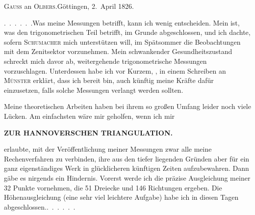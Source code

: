 \begin{center}
\textsc{Gauss} an \textsc{Olbers}.\quad Göttingen, 2.~April 1826.
\end{center}

\par\noindent\hspace*{\parindent}\mbox{.\ .\ .\ .\ .\ .}\quad Was meine Messungen betrifft, kann ich  wenig entscheiden.
Mein  ist, was den trigonometrischen Teil betrifft, im Grunde abgeschlossen, und ich dachte, sofern \textsc{Schumacher} mich  unterstützen will, im Spätsommer die Beobachtungen mit dem Zenitsektor vorzunehmen.
Mein schwankender Gesundheitszustand schreckt mich davor ab, weitergehende trigonometrische Messungen vorzuschlagen. Unterdessen habe ich vor Kurzem, , in einem Schreiben an \textsc{Münster} erklärt, dass ich bereit bin, auch künftig meine Kräfte dafür einzusetzen, falls solche Messungen verlangt werden sollten.

\par\noindent\hspace*{\parindent}Meine theoretischen Arbeiten haben bei ihrem so  großen Umfang leider noch viele Lücken. Am einfachsten wäre mir geholfen, wenn ich mir
\par\clearpage
\noindent\null\hfill{\small\textbf{ZUR HANNOVERSCHEN TRIANGULATION.}}\hfill{}\par\medskip
\noindent erlaubte, mit der Veröffentlichung meiner Messungen zwar alle meine Rechenverfahren zu verbinden, ihre  aus den tiefer liegenden Gründen aber für ein ganz eigenständiges Werk in glücklicheren künftigen Zeiten aufzubewahren.
Dann gäbe es nirgends ein Hindernis.
Vorerst werde ich die präzise Ausgleichung meiner 32 Punkte vornehmen, die 51 Dreiecke und 146 Richtungen ergeben.
Die Höhenausgleichung (eine sehr viel leichtere Aufgabe) habe ich in diesen Tagen abgeschlossen.\quad\mbox{.\ .\ .\ .\ .\ .}
